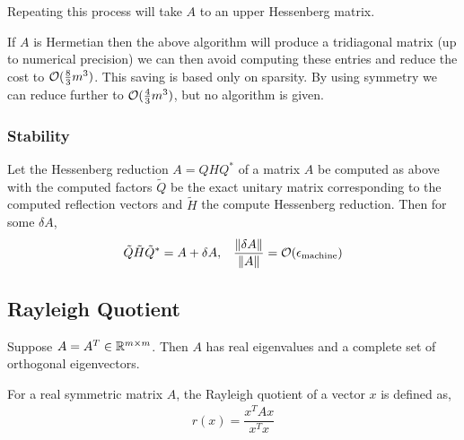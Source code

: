 \documentclass[12pt]{article}
\begin{document}
Repeating this process will take \( A \) to an upper Hessenberg matrix.

\begin{algorithm}
\begin{algorithmic}
\EndFor
\end{algorithmic}
\end{algorithm}

If \( A \) is Hermetian then the above algorithm will produce a tridiagonal matrix (up to numerical precision) we can then avoid computing these entries and reduce the cost to \( \mathcal{O}(\frac{8}{3}m^3) \). This saving is based only on sparsity. By using symmetry we can reduce further to \( \mathcal{O}(\frac{4}{3}m^3) \), but no algorithm is given.


\subsubsection{Stability}

\begin{theorem}
Let the Hessenberg reduction \( A = QHQ^* \) of a matrix \( A \) be computed as above with the computed factors \( \tilde{Q} \)  be the exact unitary matrix corresponding to the computed reflection vectors and \( \tilde{H} \) the compute Hessenberg reduction. Then for some \( \delta A \),
\begin{align*}
    \tilde{Q}\tilde{H}\tilde{Q}^* = A+ \delta A, && \dfrac{\left\lVert\delta A\right\rVert}{\left\lVert A\right\rVert} = \mathcal{O}(\epsilon_\text{machine})
\end{align*}
\end{theorem}

\subsection{Rayleigh Quotient}

Suppose \( A = A^T \in \mathbb{R}^{m\times m} \). Then \( A \) has real eigenvalues and a complete set of orthogonal eigenvectors.

\begin{definition}
For a real symmetric matrix \( A \), the Rayleigh quotient of a vector \( x \) is defined as,
\begin{align*}
    r(x) = \dfrac{x^TAx}{x^Tx}
\end{align*}
\end{definition}
\end{document}
